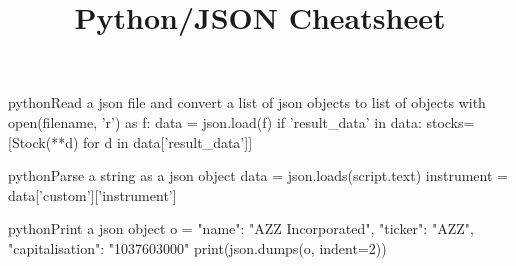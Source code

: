 \documentclass[10pt,a4paper]{article}
\title{\color{w3schools}Python/JSON Cheatsheet
}
\begin{document}
\maketitle

\small
\begin{multicols}{3}

\thispagestyle{empty}
\scriptsize



\begin{codebox}{python}{Read a json file and convert a list of json objects to list of objects}
with open(filename, 'r') as f:
        data = json.load(f)
        if 'result_data' in data:
            stocks=[Stock(**d) for d in data['result_data']]

\end{codebox}

\begin{codebox}{python}{Parse a string as a json object}
data = json.loads(script.text)
instrument = data['custom']['instrument']

\end{codebox}

\begin{codebox}{python}{Print a json object}
o =   { "name": "AZZ Incorporated", "ticker": "AZZ", "capitalisation": "1037603000" }
print(json.dumps(o, indent=2))

\end{codebox}


\AtNextBibliography{\footnotesize}
\printbibliography  
\end{multicols}
\end{document}
